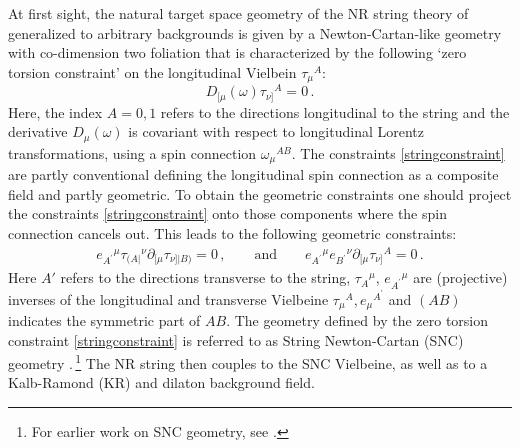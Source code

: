 \documentclass[a4paper,10pt,openany]{article}
\begin{document}
	At first sight, the natural target space geometry of the NR string theory of \cite{Gomis:2000bd,Danielsson:2000gi} generalized to arbitrary backgrounds is given by a Newton-Cartan-like geometry with co-dimension two foliation that is characterized by the following `zero torsion constraint' on the longitudinal Vielbein $\tau_\mu{}^A$:
	\begin{equation}\label{stringconstraint}
		D_{[\mu}(\omega)\tau_{\nu]}{}^A=0\,.
	\end{equation}
	Here, the index $A=0,1$ refers to the directions longitudinal to the string and the derivative $D_\mu(\omega)$ is covariant with respect to longitudinal Lorentz transformations, using a spin connection $\omega_\mu{}^{AB}$. The constraints \eqref{stringconstraint} are partly conventional defining the longitudinal spin connection as a composite field and partly geometric. To obtain the geometric constraints one should project the constraints \eqref{stringconstraint} onto those components where the spin connection cancels out. This leads to the following geometric constraints:
	\begin{align} \label{stringconstraint2}
		e_{A^\prime}{}^\mu \tau_{(A|}{}^\nu \partial_{[\mu} \tau_{\nu]| B)} =0\,,\qquad\mathrm{and}\qquad e_{A^\prime}{}^\mu e_{B^\prime}{}^\nu \partial_{[\mu} \tau_{\nu]}{}^A =0\,.
	\end{align}
	Here $A'$ refers to the directions transverse to the string, $\tau_A{}^\mu$, $e_{A^\prime}{}^\mu$ are (projective) inverses of the longitudinal and transverse Vielbeine $\tau_\mu{}^A$,\,$e_\mu{}^{A^\prime}$ and $(AB)$ indicates the symmetric part of $AB$.
	The geometry defined  by the zero torsion constraint \eqref{stringconstraint} is referred to as
	String Newton-Cartan (SNC) geometry \cite{Andringa:2012uz}.\,\footnote{For earlier work on SNC geometry, see \cite{Gomis:2005pg,Brugues:2004an,Brugues:2006yd}.}
	The NR string then couples to the SNC Vielbeine, as well as to a Kalb-Ramond (KR) and dilaton background field.
	
\end{document}
